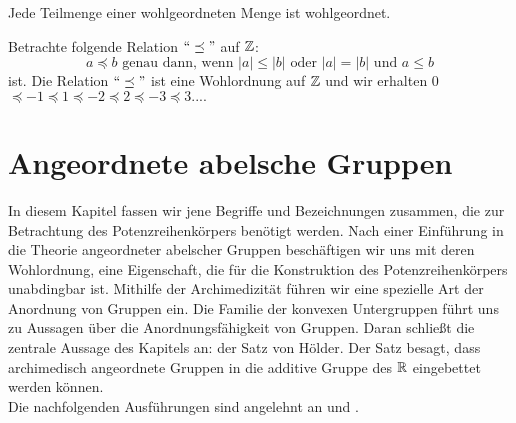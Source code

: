 %

%
%
\begin{bem}\label{Teilmengewohlgeordnet}
Jede Teilmenge einer wohlgeordneten Menge ist wohlgeordnet.
\end{bem}
\begin{bsp}
Betrachte folgende Relation $``\preceq " $ auf $\mathbb{Z}$:  
\[a \preceq b \text{ genau dann, wenn } |a| \le |b| \text{ oder }  |a| = |b| \text{ und } a \leq  b\]
ist.
Die Relation $``\preceq "$ ist eine Wohlordnung auf $\mathbb{Z}$ und wir erhalten 0$  \preceq -1 \preceq 1 \preceq -2 \preceq 2 \preceq -3 \preceq 3 .... $ 
\end{bsp}
%

%
 
\chapter{Angeordnete abelsche Gruppen}\label{chap2} %
In diesem Kapitel fassen wir jene Begriffe und Bezeichnungen zusammen, die zur Betrachtung des Potenzreihenkörpers benötigt werden. Nach einer Einführung in die Theorie angeordneter abelscher Gruppen beschäftigen wir uns mit deren Wohlordnung, eine Eigenschaft, die für die Konstruktion des Potenzreihenkörpers unabdingbar ist. Mithilfe der Archimedizität führen wir eine spezielle Art der Anordnung von Gruppen ein. Die Familie der konvexen Untergruppen führt uns zu Aussagen über die Anordnungsfähigkeit von Gruppen. Daran schließt die zentrale Aussage des Kapitels an: der Satz von Hölder. Der Satz besagt, dass archimedisch angeordnete Gruppen in die additive Gruppe des $\mathbb{R}$ eingebettet werden können. \\
Die nachfolgenden Ausführungen sind angelehnt an \cite[S. 21 - 28]{fuchs66} und \cite[S. 1 -  4]{priesscrampe83}.
%
%

